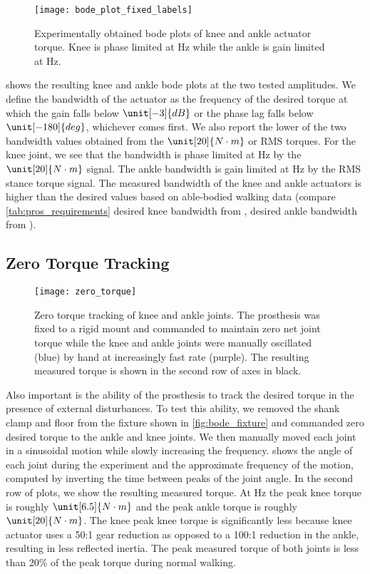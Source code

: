 \begin{figure}[htb]
    \centering 
    \texttt{[image: bode\_plot\_fixed\_labels]}
    \caption[Experimentally obtained bode plots of knee and ankle actuator
    torque]{Experimentally obtained bode plots of knee and ankle actuator
    torque. Knee is phase limited at \unit[24]{Hz} while the ankle is gain
    limited at \unit[7]{Hz}.}\label{fig:pros_eval_bode_plots}
\end{figure}
 shows the resulting knee and ankle bode plots at
the two tested amplitudes. We define the bandwidth of the actuator as the
frequency of the desired torque at which the gain falls below $\unit[-3]{dB}$ or
the phase lag falls below $\unit[-180]{deg}$, whichever comes first. We also
report the lower of the two bandwidth values obtained from the $\unit[20]{N
\cdot m}$ or RMS torques. For the knee joint, we see that the bandwidth is phase
limited at \unit[24]{Hz} by the $\unit[20]{N \cdot m}$ signal. The ankle
bandwidth is gain limited at \unit[7]{Hz} by the RMS stance torque signal. The
measured bandwidth of the knee and ankle actuators is higher than the desired
values based on able-bodied walking data (compare \cref{tab:pros_requirements}
desired knee bandwidth from \citep{sergi2012design}, desired ankle bandwidth
from \citet{au2008powered}).

\subsection{Zero Torque Tracking}
\begin{figure}[htb]
    \centering 
    \texttt{[image: zero\_torque]}
    \caption[Zero torque tracking of knee and ankle joints]{Zero torque tracking
    of knee and ankle joints. The prosthesis was fixed to a rigid mount and
    commanded to maintain zero net joint torque while the knee and ankle joints
    were manually oscillated (blue) by hand at increasingly fast rate (purple).
    The resulting measured torque is shown in the second row of axes in
    black.}\label{fig:pros_eval_zero_torque}
\end{figure}
Also important is the ability of the prosthesis to track the desired torque in
the presence of external disturbances. To test this ability, we removed the
shank clamp and floor from the fixture shown in \cref{fig:bode_fixture} and
commanded zero desired torque to the ankle and knee joints. We then manually
moved each joint in a sinusoidal motion while slowly increasing the frequency.
 shows the angle of each joint during the
experiment and the approximate frequency of the motion, computed by inverting
the time between peaks of the joint angle. In the second row of plots, we show
the resulting measured torque. At \unit[3]{Hz} the peak knee torque is roughly
$\unit[6.5]{N \cdot m}$ and the peak ankle torque is roughly $\unit[20]{N \cdot
m}$. The knee peak knee torque is significantly less because knee actuator uses
a 50:1 gear reduction as opposed to a 100:1 reduction in the ankle, resulting in
less reflected inertia. The peak measured torque of both joints is less than
20\% of the peak torque during normal walking.

